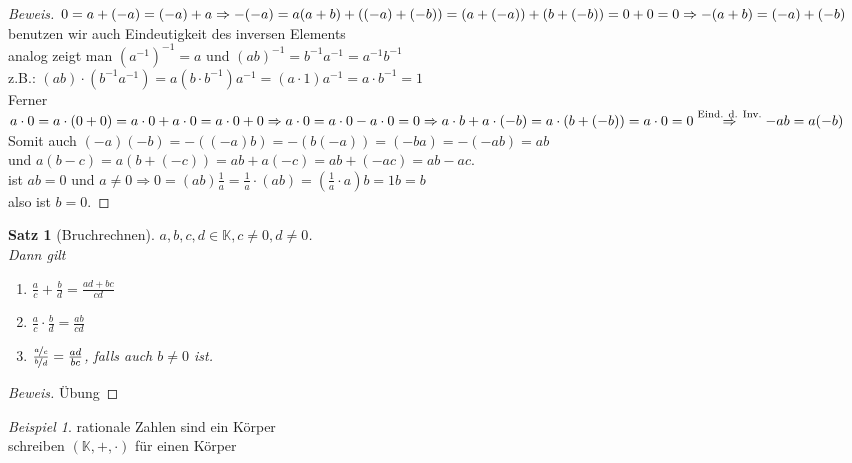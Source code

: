 \documentclass[12pt,a4paper,titlepage]{article} %
\newtheorem{satz}{Satz}[subsection]
\theoremstyle{definition}
\theoremstyle{remark}
\newtheorem*{bsp}{Beispiel}
\newenvironment{bew}{\begin{proof}[Beweis]}{\end{proof}}
\begin{document}
\begin{bew}
	$0 = a + (-a) = (-a) + a\\
	\Rightarrow -(-a) = a\\
	(a+b) + ((-a)+(-b)) = (a+(-a))+(b+(-b))=0+0=0\\
	\Rightarrow -(a+b)=(-a)+(-b)$\\
	benutzen wir auch Eindeutigkeit des inversen Elements\\
	analog zeigt man $(a^{-1})^{-1} = a$ und $(ab)^{-1}= b^{-1}a^{-1}=a^{-1}b^{-1}$\\
	z.B.: $(ab)\cdot (b^{-1}a^{-1})=a(b\cdot b^{-1}) a^{-1} = (a\cdot 1)a^{-1} = a\cdot b^{-1}=1$\\
	Ferner $a\cdot 0 = a\cdot(0+0)=a\cdot 0 + a\cdot 0 = a\cdot 0 + 0\\
	\Rightarrow a\cdot 0 = a\cdot 0 - a\cdot 0 = 0\\
	\Rightarrow a\cdot b + a\cdot (-b) = a\cdot (b+(-b)) = a\cdot 0=0\\
	\overset{\text{Eind. d. Inv.}}{\Rightarrow} -ab=a(-b)$\\
	Somit auch $(-a)(-b) = -((-a)b) = -(b(-a)) = (-ba) = -(-ab) = ab$\\
	und $a(b-c) = a(b+(-c))=ab+a(-c)=ab+(-ac)=ab-ac$.\\
	ist $ab = 0$ und $a\neq 0 \Rightarrow 0=(ab)\frac{1}{a}=\frac{1}{a}\cdot (ab)=(\frac{1}{a}\cdot a)b = 1b = b$\\also ist $b=0$. 
\end{bew}
\begin{satz}[Bruchrechnen]
	$a,b,c,d\in\mathbb{K}, c\neq 0, d\neq 0$.\\
	Dann gilt
	\begin{enumerate}
		\item $\frac{a}{c}+\frac{b}{d}=\frac{ad+bc}{cd}$
		\item $\frac{a}{c}\cdot\frac{b}{d}=\frac{ab}{cd}$
		\item $\frac{\nicefrac{a}{c}}{\nicefrac{b}{d}} = \frac{ad}{bc}$, falls auch $b\neq 0$ ist.
	\end{enumerate}
\end{satz}
\begin{bew}
	Übung
\end{bew}
\begin{bsp}
	rationale Zahlen sind ein Körper\\
	schreiben $(\mathbb{K},+,\cdot)$ für einen Körper
\end{bsp}
\end{document}
